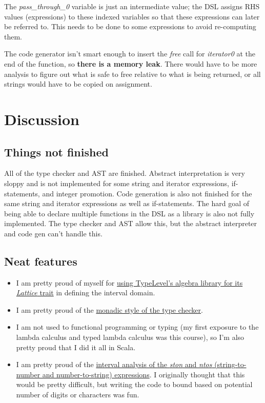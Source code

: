 \documentclass[letterpaper]{article}
\begin{document}
The \textit{pass\_through\_0} variable is just an intermediate value; the DSL assigns RHS values
(expressions) to these indexed variables so that these expressions can later be referred
to. This needs to be done to some expressions to avoid re-computing them.

The code generator isn't smart enough to insert the \textit{free} call for \textit{iterator0} at
the end of the function, so \textbf{there is a memory leak}. There would have to be more
analysis to figure out what is safe to free relative to what is being returned, or all strings
would have to be copied on assignment.

\section{Discussion}
\label{sec:discussion}

\subsection{Things not finished}

All of the type checker and AST are finished. Abstract interpretation is very sloppy
and is not implemented for some string and iterator expressions, if-statements, and
integer promotion. Code generation is also not finished for the same string and iterator
expressions as well as if-statements. The hard goal of being able to declare multiple
functions in the DSL as a library is also not fully implemented. The type checker and AST
allow this, but the abstract interpreter and code gen can't handle this. 

\subsection{Neat features}

\begin{itemize}
  \item I am pretty proud of myself for \href{https://github.com/Flandini/cse501project20au/blob/master/scala-dsl/dsl/src/main/scala/Interval.scala#L2}{using TypeLevel's algebra library for its \textit{Lattice} trait} in defining the interval domain.

  \item I am pretty proud of the \href{https://github.com/Flandini/cse501project20au/blob/master/scala-dsl/dsl/src/main/scala/TypeCheck.scala#L99}{monadic style of the type checker}.

  \item I am not used to functional programming or typing (my first exposure to the lambda calculus and typed lambda calculus was this course), so I'm also pretty proud that I did it all in Scala.

  \item I am pretty proud of the \href{https://github.com/Flandini/cse501project20au/blob/master/scala-dsl/dsl/src/main/scala/SafetyChecks.scala#L480}{interval analysis of the \textit{ston} and \textit{ntos} (string-to-number and number-to-string) expressions}. I originally thought that this would be pretty difficult, but writing the code to bound based on potential number of digits or characters was fun.
\end{itemize}
\end{document}
